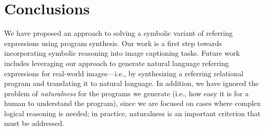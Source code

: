 


\section{Conclusions}

We have proposed an approach to solving a symbolic variant of referring expressions using program synthesis. Our work is a first step towards incorporating symbolic reasoning into image captioning tasks. Future work includes leveraging our approach to generate natural language referring expressions for real-world images---i.e., by synthesizing a referring relational program and translating it to natural language. In addition, we have ignored the problem of \emph{naturalness} for the programs we generate (i.e., how easy it is for a human to understand the program), since we are focused on cases where complex logical reasoning is needed; in practice, naturalness is an important criterion that must be addressed.